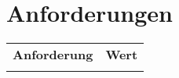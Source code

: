 
\section{Anforderungen}


\begin{table}[h!]
  \begin{tabular}{@{}ll}
    \textbf{Anforderung}        & \textbf{Wert} \\
                                &  \\
  \end{tabular}
\end{table}

